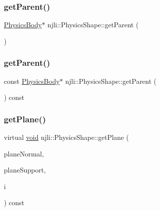 \mbox{\label{classnjli_1_1_physics_shape_a060d12d9eabbed9aa1187580def44571}} 
\subsubsection{\texorpdfstring{get\+Parent()}{getParent()}\hspace{0.1cm}{\footnotesize\ttfamily [1/2]}}
{\footnotesize\ttfamily \mbox{\hyperlink{classnjli_1_1_physics_body}{Physics\+Body}}$\ast$ njli\+::\+Physics\+Shape\+::get\+Parent (\begin{DoxyParamCaption}{ }\end{DoxyParamCaption})\hspace{0.3cm}{\ttfamily [protected]}}

\mbox{\label{classnjli_1_1_physics_shape_ad13001911fd2fe30b2eee35b883b6bbd}} 
\subsubsection{\texorpdfstring{get\+Parent()}{getParent()}\hspace{0.1cm}{\footnotesize\ttfamily [2/2]}}
{\footnotesize\ttfamily const \mbox{\hyperlink{classnjli_1_1_physics_body}{Physics\+Body}}$\ast$ njli\+::\+Physics\+Shape\+::get\+Parent (\begin{DoxyParamCaption}{ }\end{DoxyParamCaption}) const\hspace{0.3cm}{\ttfamily [protected]}}

\mbox{\label{classnjli_1_1_physics_shape_ad5418af48c1210d6d5119244826cacbb}} 
\subsubsection{\texorpdfstring{get\+Plane()}{getPlane()}}
{\footnotesize\ttfamily virtual \mbox{\hyperlink{_thread_8h_af1e856da2e658414cb2456cb6f7ebc66}{void}} njli\+::\+Physics\+Shape\+::get\+Plane (\begin{DoxyParamCaption}\item[{bt\+Vector3 \&}]{plane\+Normal,  }\item[{bt\+Vector3 \&}]{plane\+Support,  }\item[{int}]{i }\end{DoxyParamCaption}) const\hspace{0.3cm}{\ttfamily [pure virtual]}}

